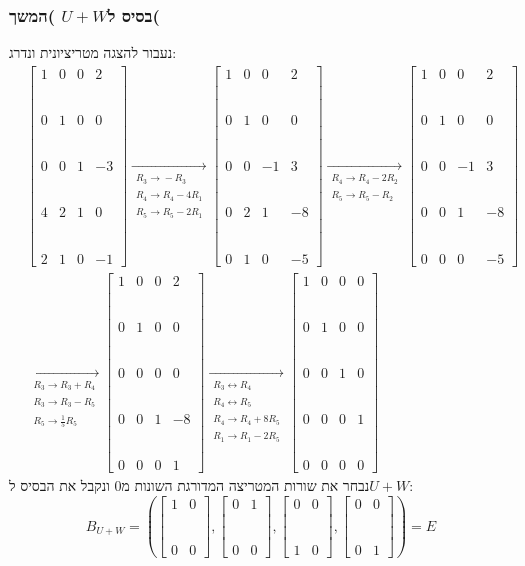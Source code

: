 \documentclass[11pt, oneside]{article}
\newcommand{\qed}{\R{$\blacksquare$}}
\newcommand{\br}{\\\\\\\\\\\\}
\newcommand{\opr}[1]{\xrightarrow[\text{#1}]{}}
\newcommand{\oprm}[1]{\underset{\substack{#1}}{\longrightarrow}}
\newcommand{\bidiarrow}[1]{\underset{\text{#1}}{\leftrightarrow}}
\newcommand{\tot}[4]{\begin{bmatrix}#1 & #2\br#3 & #4\end{bmatrix}}
\begin{document}
\subsubsection{בסיס ל$U + W$ )המשך(}
נעבור להצגה מטריציונית ונדרג:
\begin{align*}
& \begin{bmatrix}
1 & 0 & 0 & 2\br
0 & 1 & 0 & 0\br
0 & 0 & 1 & -3\br
4 & 2 & 1 & 0\br
2 & 1 & 0 & -1
\end{bmatrix}
\oprm{%
R_3 \opr{} -R_3\\
R_4 \opr{} R_4 - 4R_1\\
R_5 \opr{} R_5 - 2R_1
}
\begin{bmatrix}
1 & 0 & 0 & 2\br
0 & 1 & 0 & 0\br
0 & 0 & -1 & 3\br
0 & 2 & 1 & -8\br
0 & 1 & 0 & -5
\end{bmatrix}
\oprm{%
R_4 \opr{} R_4 - 2R_2\\
R_5 \opr{} R_5 - R_2
}
\begin{bmatrix}
1 & 0 & 0 & 2\br
0 & 1 & 0 & 0\br
0 & 0 & -1 & 3\br
0 & 0 & 1 & -8\br
0 & 0 & 0 & -5
\end{bmatrix}\\
& \oprm{%
R_3 \opr{} R_3 + R_4\\
R_3 \opr{} R_3 - R_5\\
R_5 \opr{} \frac{1}{5} R_5
}
\begin{bmatrix}
1 & 0 & 0 & 2\br
0 & 1 & 0 & 0\br
0 & 0 & 0 & 0\br
0 & 0 & 1 & -8\br
0 & 0 & 0 & 1
\end{bmatrix}
\oprm{%
R_3 \bidiarrow{} R_4\\
R_4 \bidiarrow{} R_5\\
R_4 \opr{} R_4 + 8R_5\\
R_1 \opr{} R_1 -2R_5
}
\begin{bmatrix}
1 & 0 & 0 & 0\br
0 & 1 & 0 & 0\br
0 & 0 & 1 & 0\br
0 & 0 & 0 & 1\br
0 & 0 & 0 & 0
\end{bmatrix}
\end{align*}
נבחר את שורות המטריצה המדורגת השונות מ$0$ ונקבל את הבסיס ל$U + W$:
$$B_{U + W} = \left(\tot{1}{0}{0}{0}, \tot{0}{1}{0}{0}, \tot{0}{0}{1}{0}, \tot{0}{0}{0}{1}\right) = E$$
\qed
\end{document}
